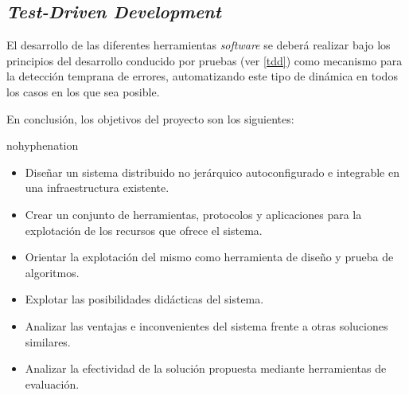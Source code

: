 \subsection{\textit{Test-Driven Development}}

El desarrollo de las diferentes herramientas \textit{software} se deberá realizar bajo los principios del desarrollo conducido por pruebas (ver \ref{tdd}) como mecanismo para la detección temprana de errores, automatizando este tipo de dinámica en todos los casos en los que sea posible.

\vspace{2cm}

En conclusión, los objetivos del proyecto son los siguientes:

\begin{hyphenrules}{nohyphenation}
\begin{center}
\itshape
\begin{itemize}
	\item[] Diseñar un sistema distribuido no jerárquico autoconfigurado e integrable en una infraestructura existente.
	\item[] Crear un conjunto de herramientas, protocolos y aplicaciones para la explotación de los recursos que ofrece el sistema.
	\item[] Orientar la explotación del mismo como herramienta de diseño y prueba de algoritmos.
	\item[] Explotar las posibilidades didácticas del sistema.
	\item[] Analizar las ventajas e inconvenientes del sistema frente a otras soluciones similares.
	\item[] Analizar la efectividad de la solución propuesta mediante herramientas de evaluación.
\end{itemize}
\end{center}
\end{hyphenrules}